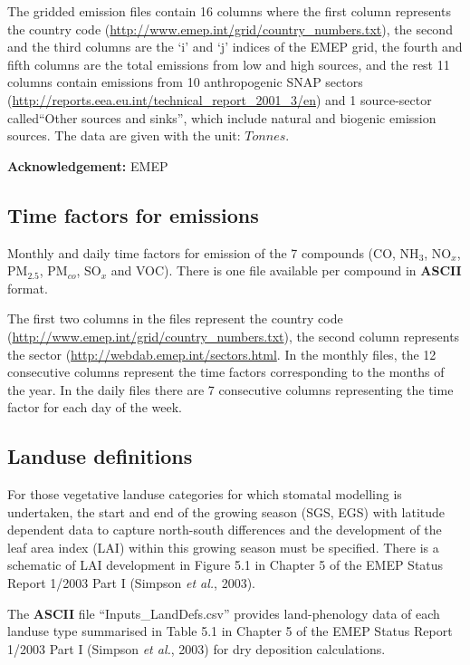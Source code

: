 The gridded emission files contain 16 columns where the first column 
represents the country code
(\url{http://www.emep.int/grid/country_numbers.txt}), 
the second and the third columns are the `i' and `j' indices of the
EMEP grid, the fourth and fifth columns are the total emissions from
low and high sources, and the rest 11 columns contain emissions from 
10 anthropogenic SNAP sectors 
(\url{http://reports.eea.eu.int/technical_report_2001_3/en}) and 1 
source-sector called``Other sources and sinks'', which include natural and
biogenic emission sources. The data are given with the unit: $Tonnes$.

{\bf Acknowledgement:} EMEP

\subsection{Time factors for emissions}

Monthly and daily time factors for emission of the 7 compounds 
(CO, NH$_{3}$, NO$_{x}$, PM$_{2.5}$, PM$_{co}$, SO$_{x}$ and VOC). 
There is one file available per compound in {\bf ASCII} format. 

The first two columns in the files represent the country code
(\url{http://www.emep.int/grid/country_numbers.txt}), the second column 
represents the sector (\url{http://webdab.emep.int/sectors.html}. In the monthly files, 
the 12 consecutive columns represent the time factors corresponding to 
the months of the year. In the daily files there are 7 consecutive columns representing 
the time factor for each day of the week. 

\subsection{Landuse definitions}
For those vegetative landuse categories for which stomatal modelling is
undertaken, the start and end of the growing season (SGS, EGS) with
latitude dependent data to capture north-south differences and the
development of the leaf area index (LAI) within this growing season
must be specified. There is a schematic of LAI development in Figure
5.1 in Chapter 5 of the EMEP Status Report 1/2003 Part I (Simpson {\sl et al.}, 2003).

The {\bf ASCII} file ``Inputs\_LandDefs.csv'' provides land-phenology data
of each landuse type summarised in Table 5.1 in Chapter 5 of the EMEP 
Status Report 1/2003 Part I (Simpson {\sl et al.}, 2003) for dry deposition 
calculations.

